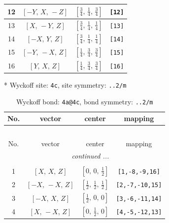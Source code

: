\documentclass[fleqn,8pt]{jsarticle}
\begin{document}
\begin{longtable}{cccc}
12 & $\left[ - Y,\, X,\, - Z \right]$ & $\left[ \frac{3}{4},\, \frac{1}{4},\, \frac{3}{4} \right]$ & {\tt [12]} \\ \hline
13 & $\left[ X,\, - Y,\, Z \right]$ & $\left[ \frac{3}{4},\, \frac{1}{4},\, \frac{1}{4} \right]$ & {\tt [13]} \\ \hline
14 & $\left[ - X,\, Y,\, Z \right]$ & $\left[ \frac{3}{4},\, \frac{1}{4},\, \frac{1}{4} \right]$ & {\tt [14]} \\ \hline
15 & $\left[ - Y,\, - X,\, Z \right]$ & $\left[ \frac{1}{4},\, \frac{3}{4},\, \frac{3}{4} \right]$ & {\tt [15]} \\ \hline
16 & $\left[ Y,\, X,\, Z \right]$ & $\left[ \frac{1}{4},\, \frac{3}{4},\, \frac{3}{4} \right]$ & {\tt [16]} \\
\end{longtable}
* Wyckoff site: {\tt 4c}, site symmetry: {\tt ..2/m}
\renewcommand{\arraystretch}{1.2}
\begin{longtable}{cccc}
\caption{Wyckoff bond: {\tt 4a@4c}, bond symmetry: {\tt ..2/m}}
 \\
 \hline \hline
No. & vector & center & mapping \\ \hline \endfirsthead

\multicolumn{3}{l}{\tablename\ \thetable{}} \\
 \hline \hline
No. & vector & center & mapping \\ \hline \endhead

 \hline \hline
\multicolumn{3}{r}{\footnotesize\it continued ...} \\ \endfoot

 \hline \hline
\multicolumn{3}{r}{} \\ \endlastfoot

1 & $\left[ X,\, X,\, Z \right]$ & $\left[ 0,\, 0,\, \frac{1}{2} \right]$ & {\tt [1,-8,-9,16]} \\ \hline
2 & $\left[ - X,\, - X,\, Z \right]$ & $\left[ \frac{1}{2},\, \frac{1}{2},\, \frac{1}{2} \right]$ & {\tt [2,-7,-10,15]} \\ \hline
3 & $\left[ - X,\, X,\, Z \right]$ & $\left[ \frac{1}{2},\, 0,\, 0 \right]$ & {\tt [3,-6,-11,14]} \\ \hline
4 & $\left[ X,\, - X,\, Z \right]$ & $\left[ 0,\, \frac{1}{2},\, 0 \right]$ & {\tt [4,-5,-12,13]} \\
\end{longtable}
\renewcommand{\arraystretch}{1.2}
\end{document}
